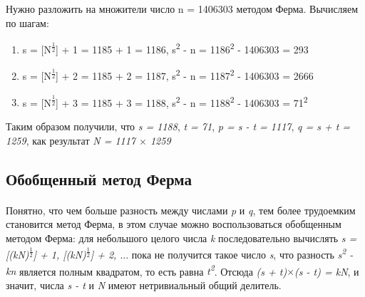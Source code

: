   \begin{example}
    Нужно разложить на множители число n = 1406303 методом Ферма. Вычисляем по шагам:
	\begin{enumerate}
	\item s = [N\textsuperscript{ {$\frac{1}{2}$}}] + 1 = 1185 + 1 = 1186, s\textsuperscript{2} - n = 1186\textsuperscript{2} - 1406303 = 293
	\item s = [N\textsuperscript{ {$\frac{1}{2}$}}] + 2 = 1185 + 2 = 1187, s\textsuperscript{2} - n = 1187\textsuperscript{2} - 1406303 = 2666
	\item s = [N\textsuperscript{ {$\frac{1}{2}$}}] + 3 = 1185 + 3 = 1188, s\textsuperscript{2} - n = 1188\textsuperscript{2} - 1406303 = 71\textsuperscript{2}
	\end{enumerate}

    Таким образом получили, что \textit{s = 1188}, \textit{t = 71}, \textit{p = s - t = 1117}, \textit{q = s + t = 1259}, как результат 
    \textit{N = 1117 {$\times$} 1259}
  \end{example}


\subsection{Обобщенный метод Ферма}

  \paragraph{} Понятно, что чем больше разность между числами \textit{p} и \textit{q}, тем более трудоемким становится метод Ферма, в этом случае 
  можно воспользоваться обобщенным методом Ферма: для небольшого целого числа \textit{k} последовательно вычислять 
  \textit{s = [(kN)\textsuperscript{ {$\frac{1}{2}$}}] + 1, [(kN)\textsuperscript{ {$\frac{1}{2}$}}] + 2, {$\dots$}} пока не получится такое число \textit{s}, 
  что разность \textit{s\textsuperscript{2} - kn} является полным квадратом, то есть равна \textit{t\textsuperscript{2}}. Отсюда
  \textit{(s + t){$\times$}(s - t) = kN}, и значит, числа \textit{s - t} и \textit{N} имеют нетривиальный общий делитель.
  
